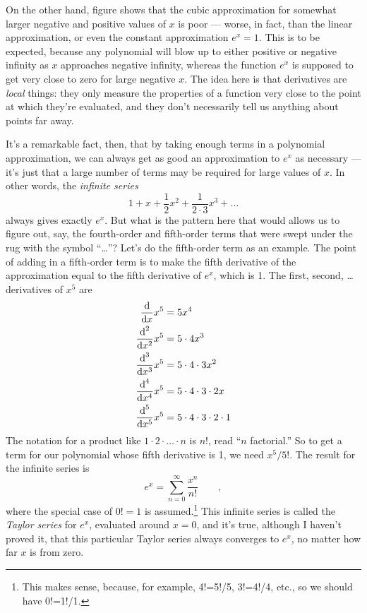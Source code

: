  On the other hand, figure  shows that 
the cubic approximation for somewhat larger negative and positive values of $x$ is poor --- worse, in fact, than the
linear approximation, or even the constant approximation $e^x=1$. This is to be expected, because
any polynomial will blow up to either positive or negative infinity as $x$ approaches negative infinity, whereas
the function $e^x$ is supposed to get very close to zero for large negative $x$. The idea here is that derivatives
are \emph{local} things: they only measure the properties of a function very close to the point at which they're
evaluated, and they don't necessarily tell us anything about points far away.
%

It's a remarkable fact, then, that by taking enough terms in a polynomial approximation, we can always get as good an
approximation to $e^x$ as necessary --- it's just that a large number of terms may be required for large values of $x$.
In other words, the \emph{infinite series}
\begin{equation*}
   1+x+\frac{1}{2}x^2+\frac{1}{2\cdot3}x^3+\ldots
\end{equation*}
always gives exactly $e^x$. But what is the pattern here that would allows us to figure out, say, the fourth-order
and fifth-order terms that were swept under the rug with the symbol ``\ldots''? Let's do the fifth-order term as
an example. The point of adding in a fifth-order term is to make the fifth derivative of the approximation equal
to the fifth derivative of $e^x$, which is 1. The first, second, \ldots derivatives of $x^5$ are
\begin{align*}
  \frac{\textup{d}}{\textup{d} x}x^5 &= 5x^4 \\
  \frac{\textup{d}^2}{\textup{d} x^2}x^5 &= 5\cdot4 x^3 \\
  \frac{\textup{d}^3}{\textup{d} x^3}x^5 &= 5\cdot4\cdot3 x^2 \\
  \frac{\textup{d}^4}{\textup{d} x^4}x^5 &= 5\cdot4\cdot3\cdot2 x \\
  \frac{\textup{d}^5}{\textup{d} x^5}x^5 &= 5\cdot4\cdot3\cdot2\cdot1  
\end{align*}
The notation for a product like $1\cdot2\cdot\ldots\cdot n$ is $n!$, read ``$n$ factorial.'' So to get a term
for our polynomial whose fifth derivative is 1, we need $x^5/5!$. The result for the infinite series is
\begin{equation*}
  e^x = \sum_{n=0}^\infty \frac{x^n}{n!} \qquad ,
\end{equation*}
where the special case of $0!=1$ is assumed.\footnote{This makes sense, because, for example, 4!=5!/5, 3!=4!/4, etc., so
we should have 0!=1!/1.} This infinite series is called the \emph{Taylor series} for $e^x$, evaluated around $x=0$, and it's true, although I haven't proved it,
that this particular Taylor series always converges to $e^x$, no matter how far $x$ is from zero.

